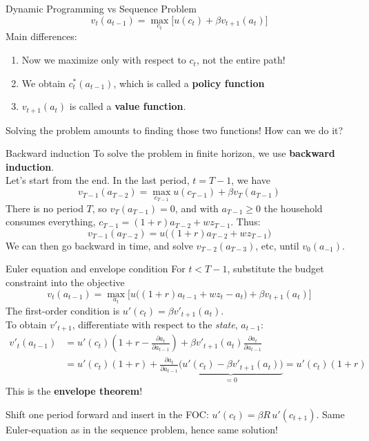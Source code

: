 \documentclass[
  10pt,
  ignorenonframetext,
  aspectratio=43,
  english,
]{beamer}
\providecommand{\tightlist}{%
  \setlength{\itemsep}{0pt}\setlength{\parskip}{0pt}}
\begin{document}
\begin{frame}{Dynamic Programming vs Sequence Problem}
\protect{}\label{dynamic-programming-vs-sequence-problem}
\[
v_{t}(a_{t-1})=\max_{c_{t}} \Big[ u(c_{t})+\beta v_{t+1}(a_{t})\Big]
\] Main differences:

\vspace{5mm}

\begin{enumerate}
\tightlist
\item
  Now we maximize only with respect to \(c_t\), not the entire path!
\item
  We obtain \(c^{\ast}_t(a_{t-1})\), which is called a \textbf{policy
  function}
\item
  \(v_{t+1}(a_t)\) is called a \textbf{value function}.
\end{enumerate}

\vspace{5mm}

Solving the problem amounts to finding those two functions! How can we
do it?
\end{frame}

\begin{frame}{Backward induction}
\protect{}\label{backward-induction}
To solve the problem in finite horizon, we use \textbf{backward
induction}.\\
Let's start from the end. In the last period, \(t=T-1\), we have \[
v_{T-1}(a_{T-2})=\max_{c_{T-1}} u(c_{T-1}) + \beta v_{T}(a_{T-1})
\] There is no period \(T\), so \(v_{T}(a_{T-1})=0\), and with \(a_{T-1}\geq0\) the household consumes everything, \(c_{T-1}=(1+r)a_{T-2}+wz_{T-1}\). Thus: \[
v_{T-1}(a_{T-2}) = u\big((1+r)a_{T-2}+wz_{T-1}\big)
\] We can then go backward in time, and solve \(v_{T-2}(a_{T-3})\), etc,
until \(v_0(a_{-1})\).
\end{frame}

\begin{frame}{Euler equation and envelope condition}
\protect{}\label{euler-equation-and-envelope-condition}
For \(t<T-1\), substitute the budget constraint into the objective \[
v_{t}(a_{t-1}) = \max_{a_{t}} \Big[u\big((1+r)a_{t-1}+wz_{t}-a_{t}\big)+\beta v_{t+1}(a_{t})\Big]
\]The first-order condition is \(u'(c_{t}) = \beta v'_{t+1}(a_{t})\). \\
To obtain \(v'_{t+1}\), differentiate with respect to the \emph{state}, \(a_{t-1}\): \[
\begin{aligned}
    v'_{t}(a_{t-1}) &= u'(c_{t}) \left(1+r-\frac{\partial a_{t}}{\partial a_{t-1}} \right) + \beta v'_{t+1}(a_{t}) \frac{\partial a_{t}}{\partial a_{t-1}}  \\
    &= u'(c_{t})(1+r) + \frac{\partial a_{t}}{\partial a_{t-1}} \underbrace{\Big(u'(c_{t}) -\beta v'_{t+1}(a_{t})\Big)}_{=0} = u'(c_{t})(1+r)
\end{aligned}
\] This is the \textbf{envelope theorem}!

Shift one period forward and insert in the FOC:
\(u'(c_{t})=\beta R\,u'(c_{t+1})\). Same Euler-equation as in the
sequence problem, hence same solution!
\end{frame}
\end{document}
